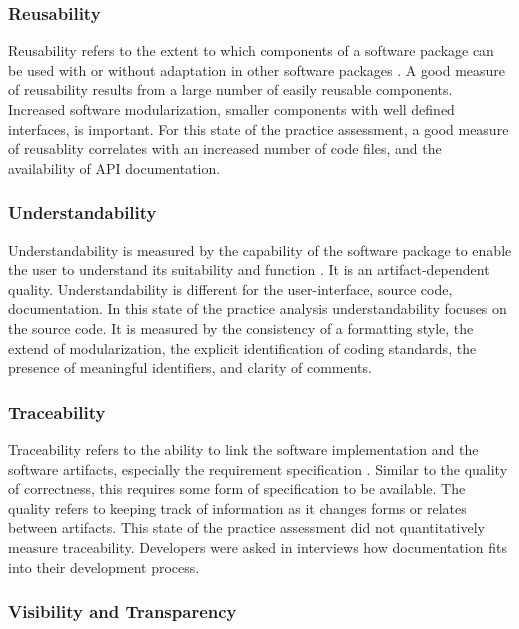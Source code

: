 \documentclass[12pt, notitlepage]{article}
\begin{document}
\subsubsection{Reusability}

Reusability refers to the extent to which components of a software package can be used with or without adaptation in other software packages \citep{kalagiakos2003non}. A good measure of reusability results from a large number of easily reusable components. Increased software modularization, smaller components with well defined interfaces, is important. For this state of the practice assessment, a good measure of reusablity correlates with an increased number of code files, and the availability of API documentation.

\subsubsection{Understandability}

Understandability is measured by the capability of the software package to enable the user to understand its suitability and function \citep{ISO9126}.
It is an artifact-dependent quality. Understandability is different for the user-interface, source code, documentation. In this state of the practice analysis understandability focuses on the source code. It is measured by the consistency of a formatting style, the extend of modularization, the explicit identification of coding standards, the presence of meaningful identifiers, and clarity of comments. 

\subsubsection{Traceability}

Traceability refers to the ability to link the software implementation and the software artifacts, especially the requirement specification \citep{McCallEtAl1977}. Similar to the quality of correctness, this requires some form of specification to be available. The quality refers to keeping track of information as it changes forms or relates between artifacts. This state of the practice assessment did not quantitatively measure traceability. Developers were asked in interviews how documentation fits into their development process.

\subsubsection{Visibility and Transparency}
\end{document}
